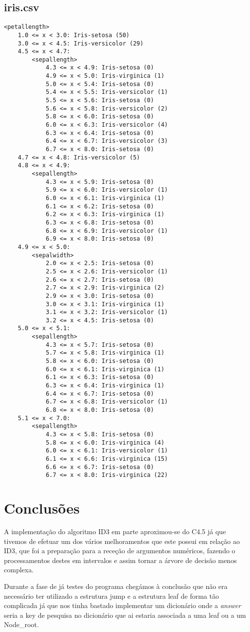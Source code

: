 \documentclass[12pt,a4paper]{article}
\begin{document}
\subsection{iris.csv}
\begin{lstlisting}
<petallength>
	1.0 <= x < 3.0: Iris-setosa (50)
	3.0 <= x < 4.5: Iris-versicolor (29)
	4.5 <= x < 4.7:
		<sepallength>
			4.3 <= x < 4.9: Iris-setosa (0)
			4.9 <= x < 5.0: Iris-virginica (1)
			5.0 <= x < 5.4: Iris-setosa (0)
			5.4 <= x < 5.5: Iris-versicolor (1)
			5.5 <= x < 5.6: Iris-setosa (0)
			5.6 <= x < 5.8: Iris-versicolor (2)
			5.8 <= x < 6.0: Iris-setosa (0)
			6.0 <= x < 6.3: Iris-versicolor (4)
			6.3 <= x < 6.4: Iris-setosa (0)
			6.4 <= x < 6.7: Iris-versicolor (3)
			6.7 <= x < 8.0: Iris-setosa (0)
	4.7 <= x < 4.8: Iris-versicolor (5)
	4.8 <= x < 4.9:
		<sepallength>
			4.3 <= x < 5.9: Iris-setosa (0)
			5.9 <= x < 6.0: Iris-versicolor (1)
			6.0 <= x < 6.1: Iris-virginica (1)
			6.1 <= x < 6.2: Iris-setosa (0)
			6.2 <= x < 6.3: Iris-virginica (1)
			6.3 <= x < 6.8: Iris-setosa (0)
			6.8 <= x < 6.9: Iris-versicolor (1)
			6.9 <= x < 8.0: Iris-setosa (0)
	4.9 <= x < 5.0:
		<sepalwidth>
			2.0 <= x < 2.5: Iris-setosa (0)
			2.5 <= x < 2.6: Iris-versicolor (1)
			2.6 <= x < 2.7: Iris-setosa (0)
			2.7 <= x < 2.9: Iris-virginica (2)
			2.9 <= x < 3.0: Iris-setosa (0)
			3.0 <= x < 3.1: Iris-virginica (1)
			3.1 <= x < 3.2: Iris-versicolor (1)
			3.2 <= x < 4.5: Iris-setosa (0)
	5.0 <= x < 5.1:
		<sepallength>
			4.3 <= x < 5.7: Iris-setosa (0)
			5.7 <= x < 5.8: Iris-virginica (1)
			5.8 <= x < 6.0: Iris-setosa (0)
			6.0 <= x < 6.1: Iris-virginica (1)
			6.1 <= x < 6.3: Iris-setosa (0)
			6.3 <= x < 6.4: Iris-virginica (1)
			6.4 <= x < 6.7: Iris-setosa (0)
			6.7 <= x < 6.8: Iris-versicolor (1)
			6.8 <= x < 8.0: Iris-setosa (0)
	5.1 <= x < 7.0:
		<sepallength>
			4.3 <= x < 5.8: Iris-setosa (0)
			5.8 <= x < 6.0: Iris-virginica (4)
			6.0 <= x < 6.1: Iris-versicolor (1)
			6.1 <= x < 6.6: Iris-virginica (15)
			6.6 <= x < 6.7: Iris-setosa (0)
			6.7 <= x < 8.0: Iris-virginica (22)
\end{lstlisting}

\section{Conclusões}
A implementação do algoritmo ID3 em parte aproximou-se do C4.5 já que tivemos de efetuar um dos vários melhoramentos que este possui em relação ao ID3, que foi a preparação para a receção de argumentos numéricos, fazendo o processamentos destes em intervalos e assim tornar a árvore de decisão menos complexa.

Durante a fase de já testes do programa chegámos à conclusão que não era necessário ter utilizado a estrutura jump e a estrutura leaf de forma tão complicada já que nos tinha bastado implementar um dicionário onde a \textit{answer} seria a key de pesquisa no dicionário que ai estaria associada a uma leaf ou a um Node\_root.

 
\end{document}
